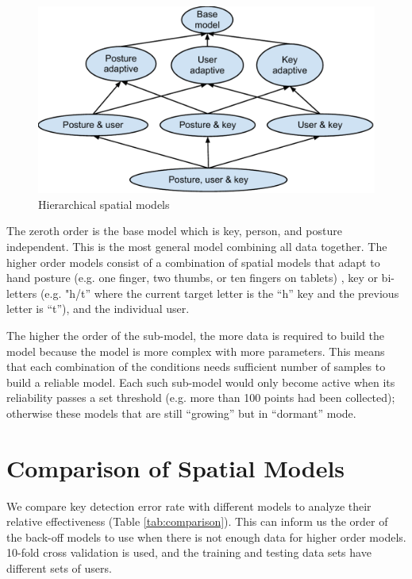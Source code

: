 \documentclass{sigchi}
\begin{document}
\begin{figure}[tb]
  \centering
  \includegraphics[width=1\columnwidth]{figures/hierarchical-spatial-model.pdf}
  \caption{Hierarchical spatial models}
  \label{fig:hierarchy}
\end{figure}

The zeroth order is the base model which is key, person, and posture
independent. This is the most general model combining all data together. The
higher order models consist of a combination of spatial models that adapt to hand 
posture (e.g. one finger, two thumbs, or ten fingers on tablets) , key or 
bi-letters (e.g. "h/t” where the current target letter is the “h” key and the 
previous letter is “t”), and the individual user. 

The higher the order of the sub-model, the more data is required to build the model because
the model is more complex with more parameters. This means that each combination of the 
conditions needs sufficient number of samples to build a reliable model. Each 
such sub-model would only become active when its reliability passes a set 
threshold (e.g. more than 100 points had been collected); otherwise these models
 that are still “growing” but in “dormant” mode.

\section{Comparison of Spatial Models}
We compare key detection error rate with different models to analyze their
relative effectiveness (Table \ref{tab:comparison}). This can inform us the order of the
back-off models to use when there is not enough data for higher order models.
10-fold cross validation is used, and the training and testing data sets have
different sets of users.
\end{document}
